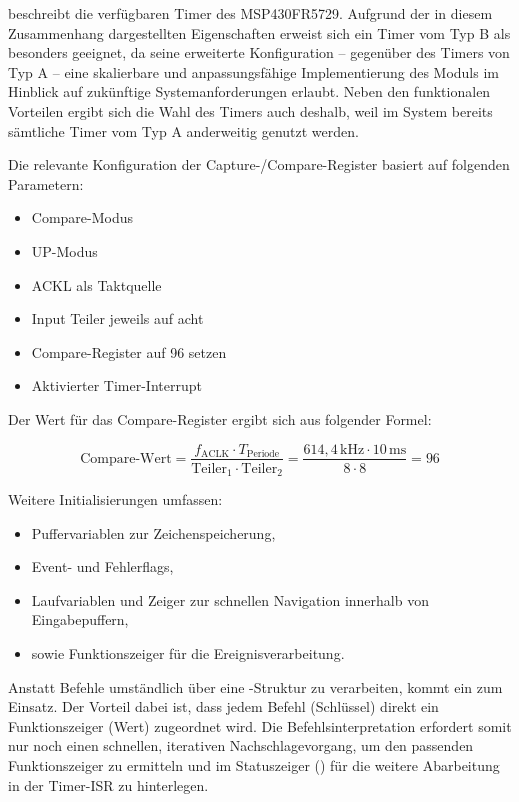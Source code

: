  beschreibt die verf\"ugbaren Timer des MSP430FR5729. Aufgrund der in diesem Zusammenhang dargestellten Eigenschaften erweist sich ein Timer vom Typ B als besonders geeignet, da seine erweiterte Konfiguration -- gegen\"uber des Timers von Typ A -- eine skalierbare und anpassungsf\"ahige Implementierung des Moduls im Hinblick auf zuk\"unftige Systemanforderungen erlaubt. Neben den funktionalen Vorteilen ergibt sich die Wahl des Timers auch deshalb, weil im System bereits s\"amtliche Timer vom Typ A anderweitig genutzt werden.

\newpage
Die relevante Konfiguration der Capture-/Compare-Register basiert auf folgenden Parametern:

\begin{multicols}{2}
	\begin{itemize}
		\item Compare-Modus
		\item UP-Modus
		\item ACKL als Taktquelle
	\end{itemize}	
\vfill\null
\columnbreak
	\begin{itemize}	
		\item Input Teiler jeweils auf acht
		\item Compare-Register auf 96 setzen
		\item Aktivierter Timer-Interrupt
	\end{itemize}
\vfill\null	
\end{multicols}

Der Wert f\"ur das Compare-Register ergibt sich aus folgender Formel:

\[
\text{Compare-Wert} = \frac{f_\text{ACLK} \cdot T_\text{Periode}}{\text{Teiler}_1 \cdot \text{Teiler}_2} = \frac{614{,}4\,\text{kHz} \cdot 10\,\text{ms}}{8 \cdot 8} = 96
\]

Weitere Initialisierungen umfassen:
\begin{itemize}
	\item Puffervariablen zur Zeichenspeicherung,
	\item Event- und Fehlerflags,
	\item Laufvariablen und Zeiger zur schnellen Navigation innerhalb von Eingabepuffern,
	\item sowie Funktionszeiger f\"ur die Ereignisverarbeitung.
\end{itemize}

\vspace{0.5cm}
Anstatt Befehle umst\"andlich \"uber eine -Struktur zu verarbeiten, kommt ein  zum Einsatz. Der Vorteil dabei ist, dass jedem Befehl (Schl\"ussel) direkt ein Funktionszeiger (Wert) zugeordnet wird. Die Befehlsinterpretation erfordert somit nur noch einen schnellen, iterativen Nachschlagevorgang, um den passenden Funktionszeiger zu ermitteln und im Statuszeiger () f\"ur die weitere Abarbeitung in der Timer-ISR zu hinterlegen.

